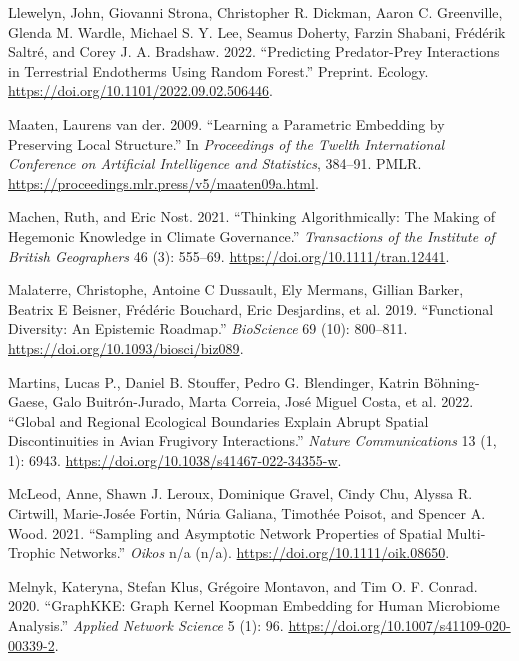 \documentclass[
  letterpaper,
  DIV=11,
  numbers=noendperiod]{scrartcl}
\newlength{\cslhangindent}
\newlength{\cslentryspacingunit} %
\newenvironment{CSLReferences}[2] %
 {%
  \setlength{\parindent}{0pt}
  \ifodd #1
  \let\oldpar\par
  \def\par{\hangindent=\cslhangindent\oldpar}
  \fi
  \setlength{\parskip}{#2\cslentryspacingunit}
 }%
 {}
\begin{document}
\begin{CSLReferences}{1}{0}
\leavevmode{}%
Llewelyn, John, Giovanni Strona, Christopher R. Dickman, Aaron C.
Greenville, Glenda M. Wardle, Michael S. Y. Lee, Seamus Doherty, Farzin
Shabani, Frédérik Saltré, and Corey J. A. Bradshaw. 2022. {``Predicting
Predator-Prey Interactions in Terrestrial Endotherms Using Random
Forest.''} Preprint. {Ecology}.
\url{https://doi.org/10.1101/2022.09.02.506446}.

\leavevmode{}%
Maaten, Laurens van der. 2009. {``Learning a {Parametric Embedding} by
{Preserving Local Structure}.''} In \emph{Proceedings of the {Twelth
International Conference} on {Artificial Intelligence} and
{Statistics}}, 384--91. {PMLR}.
\url{https://proceedings.mlr.press/v5/maaten09a.html}.

\leavevmode{}%
Machen, Ruth, and Eric Nost. 2021. {``Thinking Algorithmically: {The}
Making of Hegemonic Knowledge in Climate Governance.''}
\emph{Transactions of the Institute of British Geographers} 46 (3):
555--69. \url{https://doi.org/10.1111/tran.12441}.

\leavevmode{}%
Malaterre, Christophe, Antoine C Dussault, Ely Mermans, Gillian Barker,
Beatrix E Beisner, Frédéric Bouchard, Eric Desjardins, et al. 2019.
{``Functional {Diversity}: {An Epistemic Roadmap}.''} \emph{BioScience}
69 (10): 800--811. \url{https://doi.org/10.1093/biosci/biz089}.

\leavevmode{}%
Martins, Lucas P., Daniel B. Stouffer, Pedro G. Blendinger, Katrin
Böhning-Gaese, Galo Buitrón-Jurado, Marta Correia, José Miguel Costa, et
al. 2022. {``Global and Regional Ecological Boundaries Explain Abrupt
Spatial Discontinuities in Avian Frugivory Interactions.''} \emph{Nature
Communications} 13 (1, 1): 6943.
\url{https://doi.org/10.1038/s41467-022-34355-w}.

\leavevmode{}%
McLeod, Anne, Shawn J. Leroux, Dominique Gravel, Cindy Chu, Alyssa R.
Cirtwill, Marie-Josée Fortin, Núria Galiana, Timothée Poisot, and
Spencer A. Wood. 2021. {``Sampling and Asymptotic Network Properties of
Spatial Multi-Trophic Networks.''} \emph{Oikos} n/a (n/a).
\url{https://doi.org/10.1111/oik.08650}.

\leavevmode{}%
Melnyk, Kateryna, Stefan Klus, Grégoire Montavon, and Tim O. F. Conrad.
2020. {``{GraphKKE}: Graph {Kernel Koopman} Embedding for Human
Microbiome Analysis.''} \emph{Applied Network Science} 5 (1): 96.
\url{https://doi.org/10.1007/s41109-020-00339-2}.


\end{CSLReferences}
\end{document}
